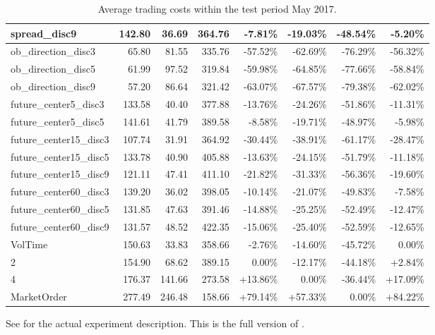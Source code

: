 \begin{table}[ht]
{\begin{tabular}{lRRR|RRRR}
spread\_disc9                 &    142.80 &   36.69 &  364.76 &   -7.81\% &  -19.03\% &  -48.54\% &       -5.20\% \\
\midrule
ob\_direction\_disc3           &     65.80 &   81.55 &  335.76 &  -57.52\% &  -62.69\% &  -76.29\% &      -56.32\% \\
ob\_direction\_disc5           &     61.99 &   97.52 &  319.84 &  -59.98\% &  -64.85\% &  -77.66\% &      -58.84\% \\
ob\_direction\_disc9           &     57.20 &   86.64 &  321.42 &  -63.07\% &  -67.57\% &  -79.38\% &      -62.02\% \\
future\_center5\_disc3         &    133.58 &   40.40 &  377.88 &  -13.76\% &  -24.26\% &  -51.86\% &      -11.31\% \\
future\_center5\_disc5         &    141.61 &   41.79 &  389.58 &   -8.58\% &  -19.71\% &  -48.97\% &       -5.98\% \\
future\_center15\_disc3        &    107.74 &   31.91 &  364.92 &  -30.44\% &  -38.91\% &  -61.17\% &      -28.47\% \\
future\_center15\_disc5        &    133.78 &   40.90 &  405.88 &  -13.63\% &  -24.15\% &  -51.79\% &      -11.18\% \\
future\_center15\_disc9        &    121.11 &   47.41 &  411.10 &  -21.82\% &  -31.33\% &  -56.36\% &      -19.60\% \\
future\_center60\_disc3        &    139.20 &   36.02 &  398.05 &  -10.14\% &  -21.07\% &  -49.83\% &       -7.58\% \\
future\_center60\_disc5        &    131.85 &   47.63 &  391.46 &  -14.88\% &  -25.25\% &  -52.49\% &      -12.47\% \\
future\_center60\_disc9        &    131.57 &   48.52 &  422.35 &  -15.06\% &  -25.40\% &  -52.59\% &      -12.65\% \\
\midrule
VolTime                      &    150.63 &   33.83 &  358.66 &   -2.76\% &  -14.60\% &  -45.72\% &        0.00\% \\
2                            &    154.90 &   68.62 &  389.15 &    0.00\% &  -12.17\% &  -44.18\% &        +2.84\% \\
4                            &    176.37 &  141.66 &  273.58 &   +13.86\% &    0.00\% &  -36.44\% &       +17.09\% \\
MarketOrder                  &    277.49 &  246.48 &  158.66 &   +79.14\% &   +57.33\% &    0.00\% &       +84.22\% \\
\bottomrule
\end{tabular}
}

        		\caption[Full version of ]{Average trading costs within the test period May 2017.}
		See  for the actual experiment description. This is the full version of .
		\label{tab:eval:additionalMarketVariables:fulltable}

\end{table}




